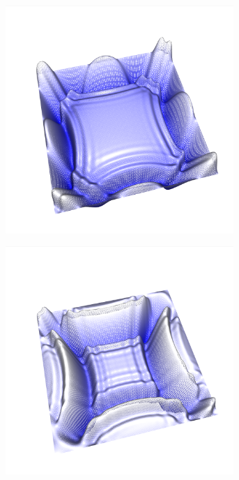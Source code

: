 \documentclass[crop=false,10pt,ngerman]{standalone}
\begin{document}
\begin{figure}[p]
        \begin{subfigure}[b]{0.24\textwidth}
          \center
          \includegraphics[trim={2cm 1.5cm 1.2cm 1.0cm},clip,width=0.95\textwidth]{images/quad_wave_4.png}
          \caption{}
        \end{subfigure}
        \begin{subfigure}[b]{0.24\textwidth}
          \center
          \includegraphics[trim={2cm 1.5cm 1.2cm 1.0cm},clip,width=0.95\textwidth]{images/quad_wave_5.png}

\end{subfigure}
\end{figure}
\end{document}
